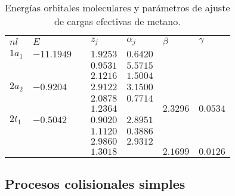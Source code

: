\begin{table}[t]
\centering
\begin{tabular}{
>{\centering\arraybackslash}p{}
>{\raggedleft\arraybackslash}p{}
>{\raggedleft\arraybackslash}p{}
>{\centering\arraybackslash}p{}
>{\centering\arraybackslash}p{}
>{\centering\arraybackslash}p{}
>{\centering\arraybackslash}p{}}
\rowcolor{mydarkgray} 
   $nl$ & $E$        && $z_j$    & $\alpha_j$ & $\beta$ & $\gamma$\\
$1a_1$  & $-11.1949$ && $1.9253$ & $0.6420$ & & \\
\rowcolor{mygray} 
        &            && $0.9531$ & $5.5715$ & & \\
        &            && $2.1216$ & $1.5004$ & & \\
\rowcolor{mygray} 
$2a_2$  & $-0.9204$  && $2.9122$ & $3.1500$ & & \\
        &            && $2.0878$ & $0.7714$ & & \\
\rowcolor{mygray} 
        &            && $1.2364$ &          & $2.3296$ & $0.0534$\\
$2t_1$  & $-0.5042$  && $0.9020$ & $2.8951$ & & \\
\rowcolor{mygray} 
        &            && $1.1120$ & $0.3886$ & & \\
        &            && $2.9860$ & $2.9312$ & & \\
\rowcolor{mygray} 
        &            && $1.3018$ &          & $2.1699$ & $0.0126$\\ 
\end{tabular}
\caption[Energías y parámetros de ajuste de cargas efectivas de metano.]
{Energías orbitales moleculares y parámetros de ajuste de cargas 
efectivas de metano.}
\label{tab:ch4parameters}
\end{table}

\subsection{Procesos colisionales simples}
\label{subsec:procol}

